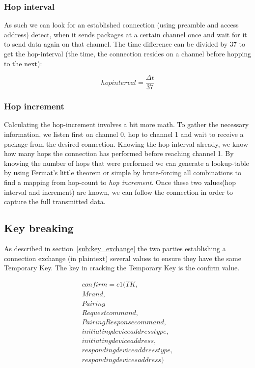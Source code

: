 \documentclass[conference]{IEEEtran}
\begin{document}
\subsubsection{Hop interval}
\label{ssub:hop_interval}

As such we can look for an established connection (using preamble and access address) detect, when it sends packages at a certain channel once and wait for it to send data again on that channel. The time difference can be divided by 37 to get the hop-interval (the time, the connection resides on a channel before hopping to the next):

\begin{equation*}
  hopinterval = \frac{\Delta t}{37}
\end{equation*}

\subsubsection{Hop increment}
\label{ssub:hop_increment}

Calculating the hop-increment involves a bit more math. To gather the necessary information, we listen first on channel 0, hop to channel 1 and wait to receive a package from the desired connection. Knowing the hop-interval already, we know how many hops the connection has performed before reaching channel 1. By knowing the number of hops that were performed we can generate a lookup-table by using Fermat’s little theorem or simple by brute-forcing all combinations to find a mapping from hop-count to \emph{hop increment}. Once these two values(hop interval and increment) are known, we can follow the connection in order to capture the full transmitted data.

\subsection{Key breaking}

As described in section~\ref{sub:key_exchange} the two parties establishing a connection exchange (in plaintext) several values to ensure they have the same Temporary Key. The key in cracking the Temporary Key is the confirm value.

\begin{equation*}
  \begin{split}
  confirm = c1 ( TK , \\Mrand , \\Pairing \\Request command, \\Pairing Response command, \\initiating device address type, \\initiating device address, \\responding device address type, \\responding devices address)
  \end{split}
\end{equation*}
\end{document}
